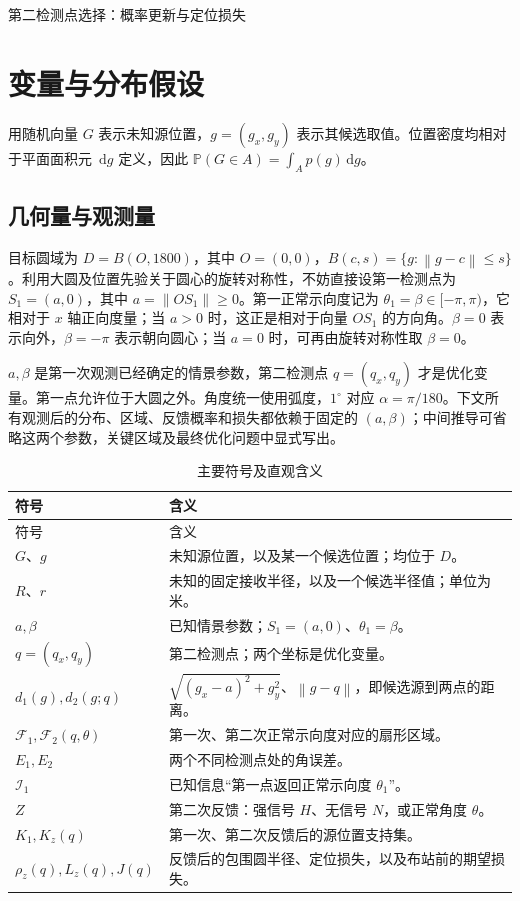 \documentclass[UTF8,a4paper,zihao=-4,fontset=none]{ctexart}
\numberwithin{equation}{section}
\newcommand{\dd}{\,\mathrm d}
\newcommand{\Prob}{\mathbb P}
\newcommand{\norm}[1]{\left\lVert#1\right\rVert}
\begin{document}
\begin{center}
{\normalfont\LARGE\sffamily\mdseries 第二检测点选择：概率更新与定位损失}\par
\end{center}
\vspace{2em}

\section{变量与分布假设}
用随机向量 \(G\) 表示未知源位置，\(g=(g_x,g_y)\) 表示其候选取值。位置密度均相对于平面面积元 \(\dd g\) 定义，因此 \(\Prob(G\in A)=\int_A p(g)\dd g\)。

\subsection{几何量与观测量}
目标圆域为 \(D=B(O,1800)\)，其中 \(O=(0,0)\)，\(B(c,s)=\{g:\norm{g-c}\le s\}\)。利用大圆及位置先验关于圆心的旋转对称性，不妨直接设第一检测点为 \(S_1=(a,0)\)，其中 \(a=\norm{OS_1}\ge0\)。第一正常示向度记为 \(\theta_1=\beta\in[-\pi,\pi)\)，它相对于 \(x\) 轴正向度量；当 \(a>0\) 时，这正是相对于向量 \(OS_1\) 的方向角。\(\beta=0\) 表示向外，\(\beta=-\pi\) 表示朝向圆心；当 \(a=0\) 时，可再由旋转对称性取 \(\beta=0\)。

\(a,\beta\) 是第一次观测已经确定的情景参数，第二检测点 \(q=(q_x,q_y)\) 才是优化变量。第一点允许位于大圆之外。角度统一使用弧度，\(1^\circ\) 对应 \(\alpha=\pi/180\)。下文所有观测后的分布、区域、反馈概率和损失都依赖于固定的 \((a,\beta)\)；中间推导可省略这两个参数，关键区域及最终优化问题中显式写出。

\begin{longtable}{p{}p{}}
\caption{主要符号及直观含义}\label{tab:symbols}\\
\toprule 符号 & 含义 \\\midrule\endfirsthead
\toprule 符号 & 含义 \\\midrule\endhead
\bottomrule\endfoot
\(G\)、\(g\) & 未知源位置，以及某一个候选位置；均位于 \(D\)。\\
\(R\)、\(r\) & 未知的固定接收半径，以及一个候选半径值；单位为米。\\
\(a,\beta\) & 已知情景参数；\(S_1=(a,0)\)、\(\theta_1=\beta\)。\\
\(q=(q_x,q_y)\) & 第二检测点；两个坐标是优化变量。\\
\(d_1(g),d_2(g;q)\) & \(\sqrt{(g_x-a)^2+g_y^2}\)、\(\norm{g-q}\)，即候选源到两点的距离。\\
\(\mathcal F_1,\mathcal F_2(q,\theta)\) & 第一次、第二次正常示向度对应的扇形区域。\\
\(E_1,E_2\) & 两个不同检测点处的角误差。\\
\(\mathcal I_1\) & 已知信息“第一点返回正常示向度 \(\theta_1\)”。\\
\(Z\) & 第二次反馈：强信号 \(H\)、无信号 \(N\)，或正常角度 \(\theta\)。\\
\(K_1,K_z(q)\) & 第一次、第二次反馈后的源位置支持集。\\
\(\rho_z(q),L_z(q),J(q)\) & 反馈后的包围圆半径、定位损失，以及布站前的期望损失。\\
\end{longtable}
\end{document}
